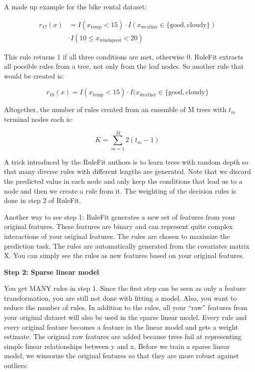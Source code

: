 \documentclass[12pt,]{krantz}
\begin{document}
A made up example for the bike rental dataset:

\begin{align*}
r_{17}(x) & = I(x_{\text{temp}}<15) \cdot I(x_{\text{weather}}\in\{\text{good},\text{cloudy}\}) \\
            & \cdot I(10\leq x_{\text{windspeed}}<20) 
\end{align*}

This rule returns 1 if all three conditions are met, otherwise 0.
RuleFit extracts all possible rules from a tree, not only from the leaf
nodes. So another rule that would be created is:

\[r_{18}(x)=I(x_{\text{temp}}<15)\cdot I(x_{\text{weather}}\in\{\text{good},\text{cloudy}\}\]

Altogether, the number of rules created from an ensemble of M trees with
\(t_m\) terminal nodes each is:

\[K=\sum_{m=1}^M2(t_m-1)\]

A trick introduced by the RuleFit authors is to learn trees with random
depth so that many diverse rules with different lengths are generated.
Note that we discard the predicted value in each node and only keep the
conditions that lead us to a node and then we create a rule from it. The
weighting of the decision rules is done in step 2 of RuleFit.

Another way to see step 1: RuleFit generates a new set of features from
your original features. These features are binary and can represent
quite complex interactions of your original features. The rules are
chosen to maximize the prediction task. The rules are automatically
generated from the covariates matrix X. You can simply see the rules as
new features based on your original features.

\textbf{Step 2: Sparse linear model}

You get MANY rules in step 1. Since the first step can be seen as only a
feature transformation, you are still not done with fitting a model.
Also, you want to reduce the number of rules. In addition to the rules,
all your ``raw'' features from your original dataset will also be used
in the sparse linear model. Every rule and every original feature
becomes a feature in the linear model and gets a weight estimate. The
original raw features are added because trees fail at representing
simple linear relationships between y and x. Before we train a sparse
linear model, we winsorize the original features so that they are more
robust against outliers:
\end{document}
